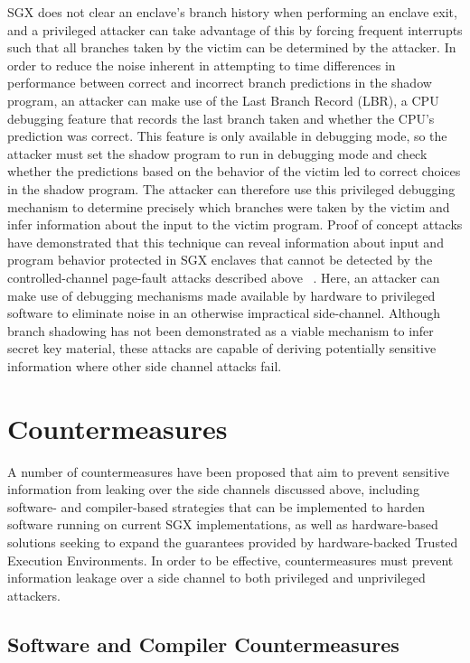 SGX does not clear an enclave's branch history when performing an enclave exit, and a privileged attacker can take advantage of this by forcing frequent interrupts such that all branches taken by the victim can be determined by the attacker. In order to reduce the noise inherent in attempting to time differences in performance between correct and incorrect branch predictions in the shadow program, an attacker can make use of the Last Branch Record (LBR), a CPU debugging feature that records the last branch taken and whether the CPU's prediction was correct. This feature is only available in debugging mode, so the attacker must set the shadow program to run in debugging mode and check whether the predictions based on the behavior of the victim led to correct choices in the shadow program. The attacker can therefore use this privileged debugging mechanism to determine precisely which branches were taken by the victim and infer information about the input to the victim program. Proof of concept attacks have demonstrated that this technique can reveal information about input and program behavior protected in SGX enclaves that cannot be detected by the controlled-channel page-fault attacks described above ~\cite{lee_inferring_2017, shinde_preventing_2015}. Here, an attacker can make use of debugging mechanisms made available by hardware to privileged software to eliminate noise in an otherwise impractical side-channel. Although branch shadowing has not been demonstrated as a viable mechanism to infer secret key material, these attacks are capable of deriving potentially sensitive information where other side channel attacks fail. 

\section{Countermeasures}

A number of countermeasures have been proposed that aim to prevent sensitive information from leaking over the side channels discussed above, including software- and compiler-based strategies that can be implemented to harden software running on current SGX implementations, as well as hardware-based solutions seeking to expand the guarantees provided by hardware-backed Trusted Execution Environments. In order to be effective, countermeasures must prevent information leakage over a side channel to both privileged and unprivileged attackers.

\subsection{Software and Compiler Countermeasures}

